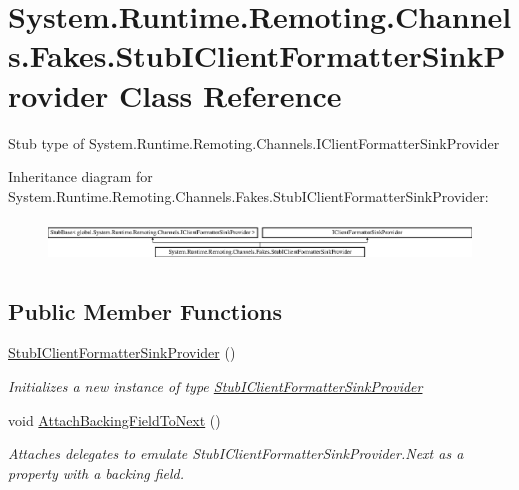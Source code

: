 \hypertarget{class_system_1_1_runtime_1_1_remoting_1_1_channels_1_1_fakes_1_1_stub_i_client_formatter_sink_provider}{\section{System.\-Runtime.\-Remoting.\-Channels.\-Fakes.\-Stub\-I\-Client\-Formatter\-Sink\-Provider Class Reference}
\label{class_system_1_1_runtime_1_1_remoting_1_1_channels_1_1_fakes_1_1_stub_i_client_formatter_sink_provider}
}


Stub type of System.\-Runtime.\-Remoting.\-Channels.\-I\-Client\-Formatter\-Sink\-Provider 


Inheritance diagram for System.\-Runtime.\-Remoting.\-Channels.\-Fakes.\-Stub\-I\-Client\-Formatter\-Sink\-Provider\-:\begin{figure}[H]
\begin{center}
\leavevmode
\includegraphics[height=1.117764cm]{class_system_1_1_runtime_1_1_remoting_1_1_channels_1_1_fakes_1_1_stub_i_client_formatter_sink_provider}
\end{center}
\end{figure}
\subsection*{Public Member Functions}
\begin{DoxyCompactItemize}
\item 
\hyperlink{class_system_1_1_runtime_1_1_remoting_1_1_channels_1_1_fakes_1_1_stub_i_client_formatter_sink_provider_a83390176cbd80384baa9453ac2dcf6b2}{Stub\-I\-Client\-Formatter\-Sink\-Provider} ()
\begin{DoxyCompactList}\small\item\em Initializes a new instance of type \hyperlink{class_system_1_1_runtime_1_1_remoting_1_1_channels_1_1_fakes_1_1_stub_i_client_formatter_sink_provider}{Stub\-I\-Client\-Formatter\-Sink\-Provider}\end{DoxyCompactList}\item 
void \hyperlink{class_system_1_1_runtime_1_1_remoting_1_1_channels_1_1_fakes_1_1_stub_i_client_formatter_sink_provider_a003707c0901bd06e9f330b21f1e429dd}{Attach\-Backing\-Field\-To\-Next} ()
\begin{DoxyCompactList}\small\item\em Attaches delegates to emulate Stub\-I\-Client\-Formatter\-Sink\-Provider.\-Next as a property with a backing field.\end{DoxyCompactList}\end{DoxyCompactItemize}

